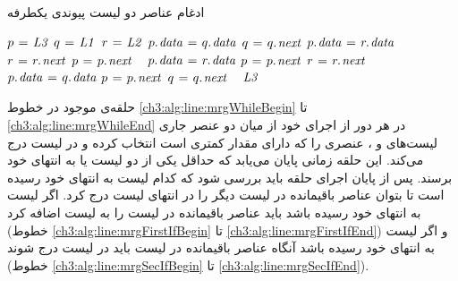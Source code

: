 \begin{algorithm}
\caption{ادغام عناصر دو لیست پیوندی یکطرفه}\label{ch3:alg:merge}
\begin{latin}
\begin{algorithmic}[1]
			\State	{}
			\State	$p \mathrel{\hspace{1pt}=\hspace{1pt}} \mathit{L3}$		
			\State	$q \mathrel{\hspace{1pt}=\hspace{1pt}} \mathit{L1}$
			\State	$r \mathrel{\hspace{1pt}=\hspace{1pt}} \mathit{L2}$	
			\label{ch3:alg:line:mrgWhileBegin}
					\State	{}
							\State	$p.\hspace*{1pt}\mathit{data} \mathrel{\hspace{1pt}=\hspace{1pt}} q.\hspace*{1pt}\mathit{data}$
							\State	$q \mathrel{\hspace{1pt}=\hspace{1pt}} q.\hspace*{1pt}\mathit{next}$
					\Else
							\State	$p.\hspace*{1pt}\mathit{data} \mathrel{\hspace{1pt}=\hspace{1pt}} r.\hspace*{1pt}\mathit{data}$
							\State	$r \mathrel{\hspace{1pt}=\hspace{1pt}} r.\hspace*{1pt}\mathit{next}$								
					\EndIf
					\State	$p \mathrel{\hspace{1pt}=\hspace{1pt}} p.\hspace*{1pt}\mathit{next}$
			\EndWhile\ \label{ch3:alg:line:mrgWhileEnd}
			\label{ch3:alg:line:mrgFirstIfBegin}
							\State	$p.\hspace*{1pt}\mathit{data} \mathrel{\hspace{1pt}=\hspace{1pt}} r.\hspace*{1pt}\mathit{data}$
									\State	\bcall{New}{$\attrib{p}{next}$}
									\State	$p \mathrel{\hspace{1pt}=\hspace{1pt}} p.\hspace*{1pt}\mathit{next}$
							\EndIf
							\State	$r \mathrel{\hspace{1pt}=\hspace{1pt}} r.\hspace*{1pt}\mathit{next}$
					\EndWhile
			\EndIf\ \label{ch3:alg:line:mrgFirstIfEnd}
			\label{ch3:alg:line:mrgSecIfBegin}
					\While{$q \neq \const{null}$}
							\State	$p.\hspace*{1pt}\mathit{data} \mathrel{\hspace{1pt}=\hspace{1pt}} q.\hspace*{1pt}\mathit{data}$
							\If{$\attrib{q}{next} \neq \const{null}$}
									\State	{}
									\State	$p \mathrel{\hspace{1pt}=\hspace{1pt}} p.\hspace*{1pt}\mathit{next}$
							\EndIf
							\State	$q \mathrel{\hspace{1pt}=\hspace{1pt}} q.\hspace*{1pt}\mathit{next}$
					\EndWhile
			\EndIf\ \label{ch3:alg:line:mrgSecIfEnd}	
		\State	\Return $\mathit{L3}$
\EndFunction
\end{algorithmic}
\end{latin}
\end{algorithm}

حلقه‌ی {} موجود در خطوط {\ref{ch3:alg:line:mrgWhileBegin}} تا {\ref{ch3:alg:line:mrgWhileEnd}} در هر دور از اجرای خود از میان دو عنصر جاری لیست‌های {} و {}، عنصری را که دارای مقدار کمتری است انتخاب کرده و در لیست {} درج می‌کند. این حلقه زمانی پایان می‌یابد که حداقل یکی از دو لیست {} یا {} به انتهای خود برسند. پس از پایان اجرای حلقه باید بررسی شود که کدام لیست به انتهای خود رسیده است تا بتوان عناصر باقیمانده در لیست دیگر را در انتهای لیست {} درج کرد. اگر لیست {} به انتهای خود رسیده باشد باید عناصر باقیمانده در لیست {} را به لیست {} اضافه کرد (خطوط {\ref{ch3:alg:line:mrgFirstIfBegin}} تا {\ref{ch3:alg:line:mrgFirstIfEnd}}) و اگر لیست {} به انتهای خود رسیده باشد آنگاه عناصر باقیمانده در لیست {} باید در لیست {} درج شوند (خطوط {\ref{ch3:alg:line:mrgSecIfBegin}} تا {\ref{ch3:alg:line:mrgSecIfEnd}}).


